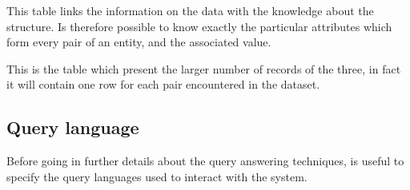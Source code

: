 \documentclass{acm_proc_article-sp-sigmod07}
\begin{document}
This table links the information on the data with the knowledge about the
structure. Is therefore possible to know exactly the particular attributes
which form every pair of an entity, and the associated value.

This is the table which present the larger number of records of the three,
in fact it will contain one row for each pair encountered in the dataset.

\subsection{Query language}
Before going in further details about the query answering techniques, is
useful to specify the query languages used to interact with the system.



\end{document}
